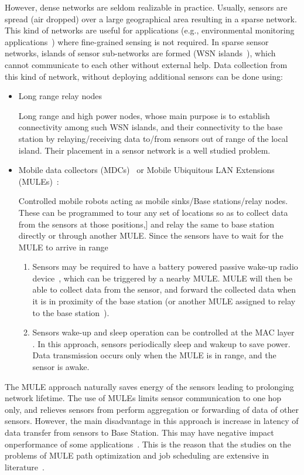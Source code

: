 However, dense networks are seldom realizable in practice. Usually, sensors are spread (air dropped) over a large geographical area resulting in a sparse network. This kind of networks are useful for applications (e.g., environmental monitoring applications~\cite{sparseEx}) where fine-grained sensing is not required. In sparse sensor networks, islands of sensor sub-networks are formed (WSN islands~\cite{intro2}), which cannot communicate to each other without external help. Data collection from this kind of network, without deploying additional sensors can be done using:
\begin{itemize}
\item Long range relay nodes~\cite{relayNodes}
  
Long range and high power nodes, whose main purpose is to establish connectivity among such WSN islands, and their connectivity to the base station by relaying/receiving data to/from sensors out of range of the local island. Their placement in a sensor network is a well studied problem.
\item Mobile data collectors (MDCs)~\cite{intro3} or Mobile Ubiquitous LAN Extensions (MULEs)~\cite{intro1}: 
  
Controlled mobile robots acting as mobile sinks/Base stations/relay nodes. These can be programmed to tour any set of locations so as to collect data from the sensors at those positions,] and relay the same to base station directly or through another MULE. Since the sensors have to wait for the MULE to arrive in range
\begin{enumerate}
\item Sensors may be required to have a battery powered passive wake-up radio device~\cite{intro4}, which can be triggered by a nearby MULE. MULE will then be able to collect data from the sensor, and forward the collected data 
when it is in proximity of the base station (or another MULE assigned to relay to the base station~\cite{sim2}). %

\item Sensors wake-up and sleep operation can be controlled at the MAC layer~\cite{dutyCycle1} \cite{dutyCycle2}. In this approach, sensors periodically sleep and wakeup to save power. Data transmission occurs only when the MULE is in range, and the sensor is awake.
\end{enumerate}
\end{itemize}

The MULE approach naturally saves energy of the sensors leading to prolonging network lifetime. The use of MULEs limits sensor communication to one hop only, and relieves sensors from perform aggregation or forwarding of data of other sensors. However, the main disadvantage in this approach is increase in latency of data transfer from sensors to Base Station. This may have negative impact onperformance of some applications~\cite{application4}. This is the reason that the studies on the problems of MULE path optimization and job scheduling are extensive in literature~\cite{muleSurvey}.

